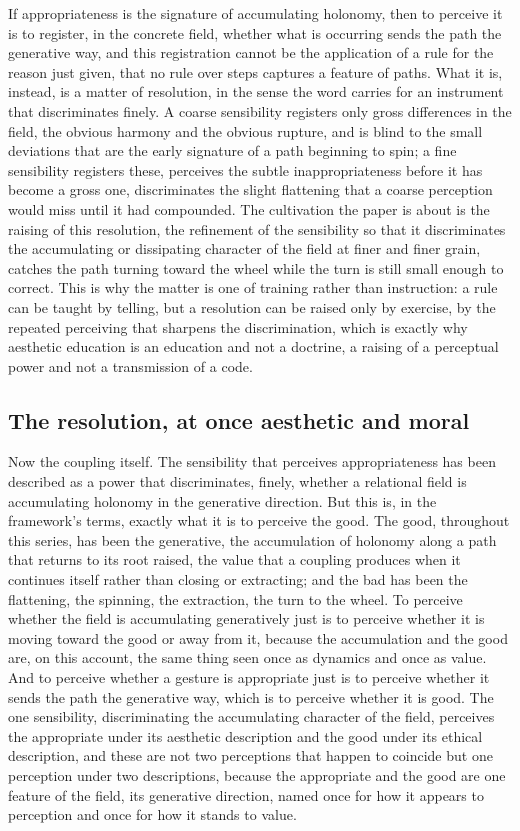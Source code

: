 If appropriateness is the signature of accumulating holonomy, then to perceive it is to register, in the concrete field, whether what is occurring sends the path the generative way, and this registration cannot be the application of a rule for the reason just given, that no rule over steps captures a feature of paths. What it is, instead, is a matter of resolution, in the sense the word carries for an instrument that discriminates finely. A coarse sensibility registers only gross differences in the field, the obvious harmony and the obvious rupture, and is blind to the small deviations that are the early signature of a path beginning to spin; a fine sensibility registers these, perceives the subtle inappropriateness before it has become a gross one, discriminates the slight flattening that a coarse perception would miss until it had compounded. The cultivation the paper is about is the raising of this resolution, the refinement of the sensibility so that it discriminates the accumulating or dissipating character of the field at finer and finer grain, catches the path turning toward the wheel while the turn is still small enough to correct. This is why the matter is one of training rather than instruction: a rule can be taught by telling, but a resolution can be raised only by exercise, by the repeated perceiving that sharpens the discrimination, which is exactly why aesthetic education is an education and not a doctrine, a raising of a perceptual power and not a transmission of a code.

\subsection{The resolution, at once aesthetic and moral}
\label{p22:sub:coupling-both}

Now the coupling itself. The sensibility that perceives appropriateness has been described as a power that discriminates, finely, whether a relational field is accumulating holonomy in the generative direction. But this is, in the framework's terms, exactly what it is to perceive the good. The good, throughout this series, has been the generative, the accumulation of holonomy along a path that returns to its root raised, the value that a coupling produces when it continues itself rather than closing or extracting; and the bad has been the flattening, the spinning, the extraction, the turn to the wheel. To perceive whether the field is accumulating generatively just is to perceive whether it is moving toward the good or away from it, because the accumulation and the good are, on this account, the same thing seen once as dynamics and once as value. And to perceive whether a gesture is appropriate just is to perceive whether it sends the path the generative way, which is to perceive whether it is good. The one sensibility, discriminating the accumulating character of the field, perceives the appropriate under its aesthetic description and the good under its ethical description, and these are not two perceptions that happen to coincide but one perception under two descriptions, because the appropriate and the good are one feature of the field, its generative direction, named once for how it appears to perception and once for how it stands to value.

